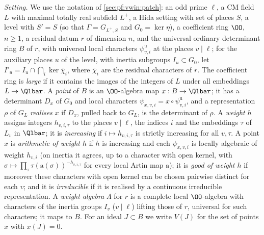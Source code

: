 \emph{Setting.} We use the notation of \cref{sec:pf:vwin:patch}: an odd prime $\ell$, a CM field $L$ with maximal totally
real subfield $L^+$, a Hida setting with set of places $S$, a level with $S'=S$ (so that $\Gamma=G_{L^+,S}$ and
$G_0=\ker\eta$), a coefficient ring $\OO$, $n\ge1$, a residual datum $r$ of dimension $n$, and the universal ordinary
determinant ring $B$ of $r$, with universal local characters $\psi^{\mathrm u}_{v,i}$ at the places $v\mid\ell$; for the
auxiliary places $u$ of the level, with inertia subgroups $I_u\subset G_0$, let $I'_u=I_u\cap\bigcap_i\ker\bar\chi_i$, where
$\bar\chi_i$ are the residual characters of $r$. The
coefficient ring is \emph{large} if it contains the images of the integers of $L$ under all embeddings $L\to\Qlbar$. A
\emph{point} of $B$ is an $\OO$-algebra map $x:B\to\Qlbar$; it has a determinant $D_x$ of $G_0$ and local characters
$\psi_{x,v,i}=x\circ\psi^{\mathrm u}_{v,i}$, and a representation $\rho$ of $G_L$ \emph{realises} $x$ if $D_x$, pulled back
to $G_L$, is the determinant of $\rho$. A \emph{weight} $h$ assigns integers $h_{v,i,\tau}$ to the places $v\mid\ell$,
the indices $i$ and the embeddings $\tau$ of $L_v$ in $\Qlbar$; it is \emph{increasing} if $i\mapsto h_{v,i,\tau}$ is
strictly increasing for all $v,\tau$. A point $x$ is \emph{arithmetic of weight $h$} if $h$ is increasing and each
$\psi_{x,v,i}$ is locally algebraic of weight $h_{v,i}$ (on inertia it agrees, up to a character with open kernel, with
$\sigma\mapsto\prod_\tau\tau(\mathrm{a}(\sigma))^{-h_{v,i,\tau}}$ for every local Artin map $\mathrm a$); it is \emph{good
of weight $h$} if moreover these characters with open kernel can be chosen pairwise distinct for each $v$; and it is
\emph{irreducible} if it is realised by a continuous irreducible representation. A \emph{weight algebra} $\Lambda$ for $r$
is a complete local $\OO$-algebra with characters of the inertia groups $I_v$ ($v\mid\ell$) lifting those of $r$, universal
for such characters; it maps to $B$. For an ideal $J\subset B$ we write $V(J)$ for the set of points $x$ with $x(J)=0$.

